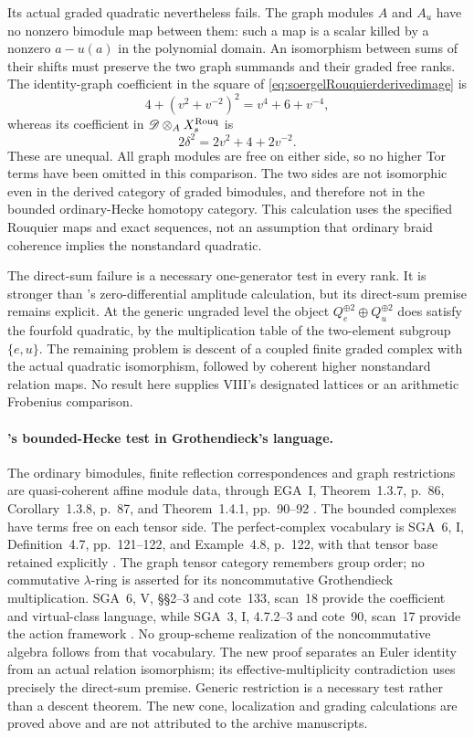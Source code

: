 Its actual graded quadratic nevertheless fails. The graph
modules \(A\) and \(A_u\) have no nonzero bimodule map
between them: such a map is a scalar killed by a nonzero
\(a-u(a)\) in the polynomial domain. An isomorphism
between sums of their shifts must preserve the two graph
summands and their graded free ranks.
The identity-graph coefficient in the square of
\eqref{eq:soergelRouquierderivedimage} is
\[
               4+(v^2+v^{-2})^2=v^4+6+v^{-4},
\]
whereas its coefficient in
\(\mathscr D\otimes_A X_s^{\rm Rouq}\) is
\[
                         2\delta^2=2v^2+4+2v^{-2}.
\]
These are unequal. All graph modules are free on either
side, so no higher Tor terms have been omitted in this
comparison. The two sides are not isomorphic even in
the derived category of graded bimodules, and therefore
not in the bounded ordinary-Hecke homotopy category.
This calculation uses the specified Rouquier maps and
exact sequences, not an assumption that ordinary braid
coherence implies the nonstandard quadratic.

The direct-sum failure is a necessary one-generator test
in every rank. It is stronger than 's
zero-differential amplitude calculation, but its
direct-sum premise remains explicit. At the generic
ungraded level the object
\(Q_e^{\oplus2}\oplus Q_u^{\oplus2}\) does satisfy the
fourfold quadratic, by the multiplication table of the
two-element subgroup \(\{e,u\}\).
The remaining problem is descent of a coupled finite
graded complex with the actual quadratic isomorphism,
followed by coherent higher nonstandard relation maps.
No result here supplies VIII's designated lattices or
an arithmetic Frobenius comparison.

\paragraph{'s bounded-Hecke test in Grothendieck's language.}
The ordinary bimodules, finite reflection correspondences
and graph restrictions are quasi-coherent affine module
data, through EGA~I, Theorem~1.3.7, p.~86,
Corollary~1.3.8, p.~87, and Theorem~1.4.1,
pp.~90--92 \cite{EGA}.
The bounded complexes have terms free on each tensor
side. The perfect-complex vocabulary is SGA~6,
I, Definition~4.7, pp.~121--122, and Example~4.8,
p.~122, with that tensor base retained explicitly
\cite{SGA6}.
The graph tensor category remembers group order;
no commutative \(\lambda\)-ring is asserted for its
noncommutative Grothendieck multiplication.
SGA~6, V, \S\S2--3 and cote~133, scan~18 provide
the coefficient and virtual-class language, while
SGA~3, I, 4.7.2--3 and cote~90, scan~17 provide
the action framework \cite{SGA3,SGA6,Archive}.
No group-scheme realization of the noncommutative algebra
follows from that vocabulary.
The new proof separates an Euler identity from an actual
relation isomorphism; its effective-multiplicity
contradiction uses precisely the direct-sum premise.
Generic restriction is a necessary test rather than a
descent theorem. The new cone, localization and grading
calculations are proved above and are not attributed to
the archive manuscripts.
